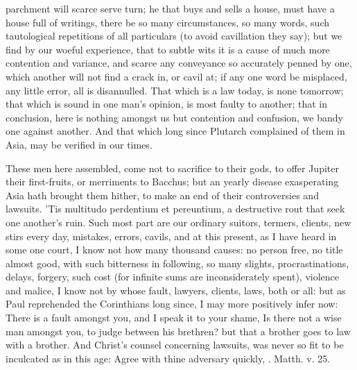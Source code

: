 {parchment will scarce serve turn; he that buys and sells a house, must
have a house full of writings, there be so many circumstances, so many
words, such tautological repetitions of all particulars (to avoid
cavillation they say); but we find by our woeful experience, that to
subtle wits it is a cause of much more contention and variance, and
scarce any conveyance so accurately penned by one, which another will
not find a crack in, or cavil at; if any one word be misplaced, any
little error, all is disannulled. That which is a law today, is none
tomorrow; that which is sound in one man's opinion, is most faulty to
another; that in conclusion, here is nothing amongst us but contention
and confusion, we bandy one against another. And that which long since
Plutarch complained of them in Asia, may be verified in our times.

These men here assembled, come not to sacrifice to their gods, to offer
Jupiter their first-fruits, or merriments to Bacchus; but an yearly
disease exasperating Asia hath brought them hither, to make an end of
their controversies and lawsuits. 'Tis multitudo perdentium et
pereuntium, a destructive rout that seek one another's ruin. Such most
part are our ordinary suitors, termers, clients, new stirs every day,
mistakes, errors, cavils, and at this present, as I have heard in some
one court, I know not how many thousand causes: no person free, no
title almost good, with such bitterness in following, so many slights,
procrastinations, delays, forgery, such cost (for infinite sums are
inconsiderately spent), violence and malice, I know not by whose fault,
lawyers, clients, laws, both or all: but as Paul reprehended the
Corinthians long since, I may more positively infer now: There is
a fault amongst you, and I speak it to your shame, Is there not a
wise man amongst you, to judge between his brethren? but that a
brother goes to law with a brother. And Christ's counsel
concerning lawsuits, was never so fit to be inculcated as in this age:
Agree with thine adversary quickly, \etc{}. Matth. v. 25.

}
